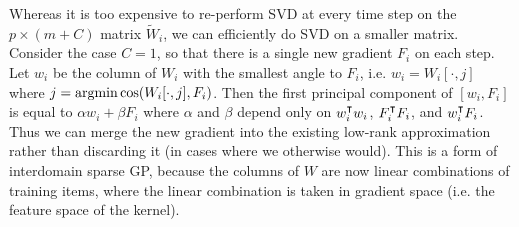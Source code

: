 Whereas it is too expensive to re-perform SVD at every time step on the $p\times (m+C)$ matrix $\tilde{W}_i$, we can efficiently do SVD on a smaller matrix. Consider the case $C=1$, so that there is a single new gradient $F_i$ on each step. Let $w_i$ be the column of $W_i$ with the smallest angle to $F_i$, i.e. $w_i = W_i[\cdot,j]$ where $j = \argmin \cos(W_i[\cdot,j],F_i)$. Then the first principal component of $[w_i,F_i]$ is equal to $\alpha w_i + \beta F_i$ where $\alpha$ and $\beta$ depend only on $w_i^\intercal w_i$, $F_i^\intercal F_i$, and $w_i^\intercal F_i$. Thus we can merge the new gradient into the existing low-rank approximation rather than discarding it (in cases where we otherwise would). This is a form of interdomain sparse GP, because the columns of $W$ are now linear combinations of training items, where the linear combination is taken in gradient space (i.e. the feature space of the kernel).
